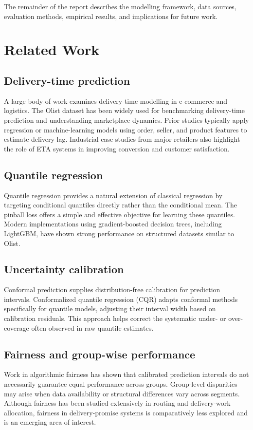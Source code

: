 \documentclass[12pt]{article}
\begin{document}
The remainder of the report describes the modelling framework, data sources, evaluation methods, empirical results, and implications for future work.

\section{Related Work}

\subsection{Delivery-time prediction}
A large body of work examines delivery-time modelling in e-commerce and logistics. The Olist dataset has been widely used for benchmarking delivery-time prediction and understanding marketplace dynamics. Prior studies typically apply regression or machine-learning models using order, seller, and product features to estimate delivery lag. Industrial case studies from major retailers also highlight the role of ETA systems in improving conversion and customer satisfaction.

\subsection{Quantile regression}
Quantile regression provides a natural extension of classical regression by targeting conditional quantiles directly rather than the conditional mean. The pinball loss offers a simple and effective objective for learning these quantiles. Modern implementations using gradient-boosted decision trees, including LightGBM, have shown strong performance on structured datasets similar to Olist.

\subsection{Uncertainty calibration}
Conformal prediction supplies distribution-free calibration for prediction intervals. Conformalized quantile regression (CQR) adapts conformal methods specifically for quantile models, adjusting their interval width based on calibration residuals. This approach helps correct the systematic under- or over-coverage often observed in raw quantile estimates.

\subsection{Fairness and group-wise performance}
Work in algorithmic fairness has shown that calibrated prediction intervals do not necessarily guarantee equal performance across groups. Group-level disparities may arise when data availability or structural differences vary across segments. Although fairness has been studied extensively in routing and delivery-work allocation, fairness in delivery-promise systems is comparatively less explored and is an emerging area of interest.
\end{document}
